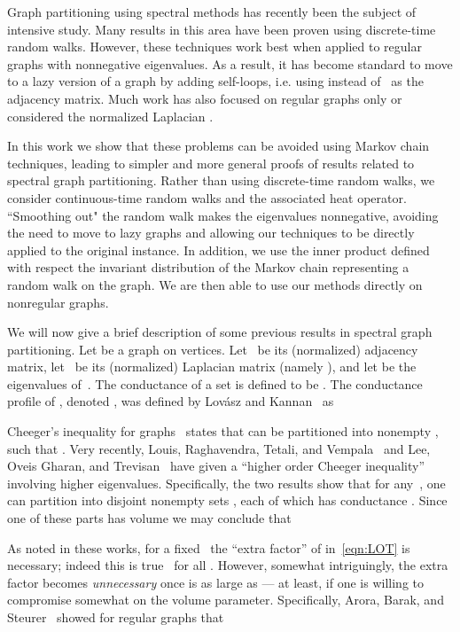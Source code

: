 \documentclass[11pt]{article}
\begin{document}
Graph partitioning using spectral methods has recently been the subject of intensive study.  Many results in this area have been proven using discrete-time random walks.  However, these techniques work best when applied to regular graphs with nonnegative eigenvalues.  As a result, it has become standard to move to a lazy version of a graph by adding self-loops, i.e. using  instead of~ as the adjacency matrix.  Much work has also focused on regular graphs only or considered the normalized Laplacian .

In this work we show that these problems can be avoided using Markov chain techniques, leading to simpler and more general proofs of results related to spectral graph partitioning.  Rather than using discrete-time random walks, we consider continuous-time random walks and the associated heat operator.  ``Smoothing out" the random walk makes the eigenvalues nonnegative, avoiding the need to move to lazy graphs and allowing our techniques to be directly applied to the original instance.  In addition, we use the inner product defined with respect the invariant distribution  of the Markov chain representing a random walk on the graph.  We are then able to use our methods directly on nonregular graphs.

We will now give a brief description of some previous results in spectral graph partitioning.  Let  be a graph on  vertices.  Let~ be its (normalized) adjacency matrix, let~ be its (normalized) Laplacian matrix (namely ), and let  be the eigenvalues of~.  The conductance  of a set  is defined to be .  The conductance profile of , denoted   , was defined by Lov\'{a}sz and Kannan~\cite{LK99} as


Cheeger's inequality for graphs~\cite{AM85,Alo86,SJ89} states that  can be partitioned into nonempty ,  such that .  Very recently, Louis, Raghavendra, Tetali, and Vempala~\cite{LRTV12} and Lee, Oveis Gharan, and Trevisan~\cite{LOT12}  have given a ``higher order Cheeger inequality'' involving higher eigenvalues.  Specifically, the two results show that for any~, one can partition  into  disjoint nonempty sets , each of which has conductance .  Since one of these parts has volume  we may conclude that


As noted in these works, for a fixed~ the ``extra factor'' of  in~\eqref{eqn:LOT} is necessary; indeed this is true~\cite{LOT12} for all .  However, somewhat intriguingly, the extra factor becomes \emph{unnecessary} once  is as large as  --- at least, if one is willing to compromise somewhat on the volume parameter.  Specifically, Arora, Barak, and Steurer~\cite{ABS10} showed for regular graphs that
\end{document}
